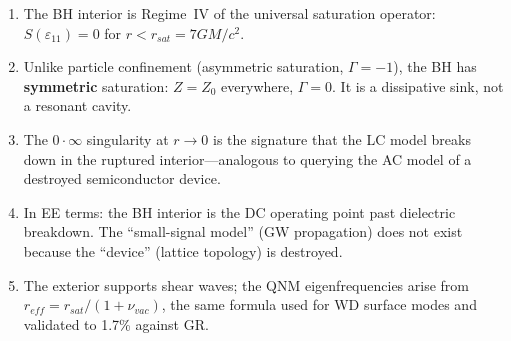 \begin{enumerate}
    \item The BH interior is Regime~IV of the universal saturation operator:
    $S(\varepsilon_{11}) = 0$ for $r < r_{sat} = 7GM/c^2$.

    \item Unlike particle confinement (asymmetric saturation, $\Gamma = -1$),
    the BH has \textbf{symmetric} saturation: $Z = Z_0$ everywhere,
    $\Gamma = 0$. It is a dissipative sink, not a resonant cavity.

    \item The $0 \cdot \infty$ singularity at $r \to 0$ is the signature
    that the LC model breaks down in the ruptured interior---analogous
    to querying the AC model of a destroyed semiconductor device.

    \item In EE terms: the BH interior is the DC operating point
    past dielectric breakdown. The ``small-signal model'' (GW propagation)
    does not exist because the ``device'' (lattice topology) is destroyed.

    \item The exterior supports shear waves; the QNM eigenfrequencies
    arise from $r_{eff} = r_{sat}/(1+\nu_{vac})$, the same formula
    used for WD surface modes and validated to 1.7\% against GR.
\end{enumerate}
